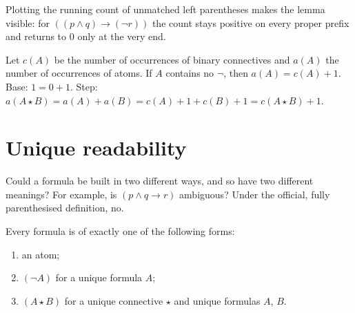 Plotting the running count of unmatched left parentheses makes the lemma visible: for
$((p\land q)\to(\neg r))$ the count stays positive on every proper prefix and returns to
$0$ only at the very end.
\begin{center}
\end{center}

\begin{example}[Counting]
Let $c(A)$ be the number of occurrences of binary connectives and $a(A)$ the number of
occurrences of atoms. If $A$ contains no $\neg$, then $a(A) = c(A)+1$. Base: $1 = 0+1$.
Step: $a(A\star B) = a(A)+a(B) = c(A)+1+c(B)+1 = c(A\star B)+1$.
\end{example}

\section{Unique readability}

Could a formula be built in two different ways, and so have two different meanings? For
example, is $(p\land q\to r)$ ambiguous? Under the official, fully parenthesised
definition, no.

\begin{theorem}
Every formula is of exactly one of the following forms:
\begin{enumerate}
  \item an atom;
  \item $(\neg A)$ for a unique formula $A$;
  \item $(A\star B)$ for a unique connective $\star$ and unique formulas $A$, $B$.
\end{enumerate}
\end{theorem}

